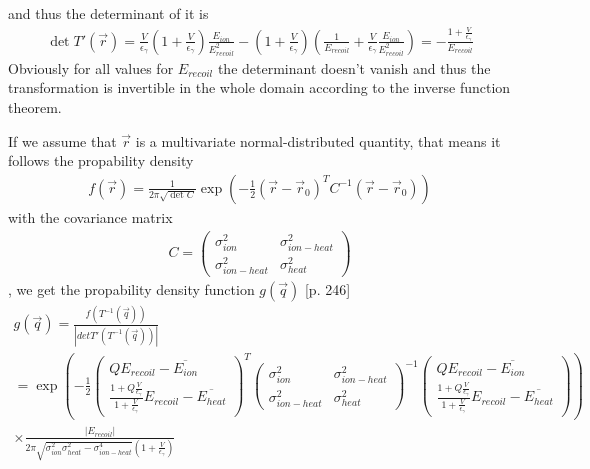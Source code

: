 and thus the determinant of it is
\begin{gather}
\det T'(\vec{r}) =  \frac{V}{\epsilon_\gamma} \left( 1 + \frac{V}{\epsilon_\gamma} \right) \frac{E_{ion}}{E_{recoil}^2} - \left(1 + \frac{V}{\epsilon_\gamma}\right) \left( \frac{1}{E_{recoil}} + \frac{V}{\epsilon_\gamma} \frac{E_{ion}}{E_{recoil}^2} \right) = - \frac{1 + \frac{V}{\epsilon_\gamma}}{E_{recoil}}
\end{gather}
Obviously for all values for $E_{recoil}$ the determinant doesn't vanish and thus the transformation is invertible in the whole domain according to the inverse function theorem.

If we assume that $\vec{r}$ is a multivariate normal-distributed quantity, that means it follows the propability density
\begin{gather}
f(\vec{r}) = \frac{1}{2 \pi \sqrt{\det C}} \exp \left( - \frac{1}{2} (\vec{r} - \vec{r}_0)^T C^{-1} (\vec{r} - \vec{r}_0) \right)
\end{gather}
with the covariance matrix
\begin{gather}
C = \begin{pmatrix} \sigma_{ion}^2 & \sigma_{ion-heat}^2 \\ \sigma_{ion-heat}^2 & \sigma_{heat}^2 \end{pmatrix}
\end{gather}
, we get the propability density function $g(\vec{q})$ \cite{Henze}[p. 246]
\begin{gather}
g(\vec{q}) = \frac{f(T^{-1}(\vec{q}))}{\left| det T'(T^{-1}(\vec{q})) \right|} \\ =  \exp \left( - \frac{1}{2}  \begin{pmatrix} Q E_{recoil} - \overline{E_{ion}}\\ \frac{1 + Q \frac{V}{\epsilon_\gamma}}{1 + \frac{V}{\epsilon_\gamma}} E_{recoil} - \overline{E_{heat}} \end{pmatrix}^T \begin{pmatrix} \sigma_{ion}^2 & \sigma_{ion-heat}^2 \\ \sigma_{ion-heat}^2 & \sigma_{heat}^2 \end{pmatrix}^{-1} \begin{pmatrix} Q E_{recoil} - \overline{E_{ion}} \\ \frac{1 + Q \frac{V}{\epsilon_\gamma}}{1 + \frac{V}{\epsilon_\gamma}} E_{recoil} - \overline{E_{heat}} \end{pmatrix} \right) \\
\times  \frac{\left| E_{recoil} \right| }{2 \pi \sqrt{\sigma_{ion}^2 \sigma_{heat}^2 - \sigma_{ion-heat}^4} \left(1 + \frac{V}{\epsilon_\gamma}\right)} \label{propfunc}
\end{gather}
